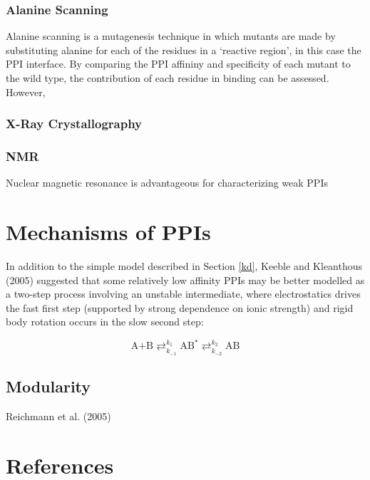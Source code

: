 \documentclass[
]{article}
\begin{document}
\hypertarget{alanine-scanning}{%
\subsubsection{Alanine Scanning}\label{alanine-scanning}}

Alanine scanning is a mutagenesis technique in which mutants are made by substituting alanine for each of the residues in a `reactive region', in this case the PPI interface. By comparing the PPI affininy and specificity of each mutant to the wild type, the contribution of each residue in binding can be assessed. However,

\hypertarget{x-ray-crystallography}{%
\subsubsection{X-Ray Crystallography}\label{x-ray-crystallography}}

\hypertarget{nmr}{%
\subsubsection{NMR}\label{nmr}}

Nuclear magnetic resonance is advantageous for characterizing weak PPIs

\hypertarget{mechanisms-of-ppis}{%
\section{Mechanisms of PPIs}\label{mechanisms-of-ppis}}

In addition to the simple model described in Section \ref{kd}, Keeble and Kleanthous (2005) suggested that some relatively low affinity PPIs may be better modelled as a two-step process involving an unstable intermediate, where electrostatics drives the fast first step (supported by strong dependence on ionic strength) and rigid body rotation occurs in the slow second step:

\[
\text{A+B} \mathrel{\mathop{\rightleftarrows}^{k_{1}}_{k_{-1}}} \text{AB}^\text{*} \mathrel{\mathop{\rightleftarrows}^{k_{2}}_{k_{-2}}} \text{AB}
\]

\hypertarget{modularity}{%
\subsection{Modularity}\label{modularity}}

Reichmann et al. (2005)

\hypertarget{references}{%
\section*{References}\label{references}}
\end{document}

